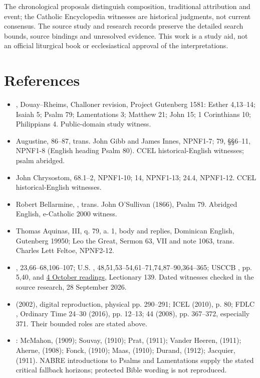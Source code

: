 The chronological proposals distinguish composition, traditional attribution and event; the Catholic Encyclopedia witnesses are historical judgments, not current consensus. The source study and research records preserve the detailed search bounds, source bindings and unresolved evidence. This work is a study aid, not an official liturgical book or ecclesiastical approval of the interpretations.

\section{References}
\begin{itemize}
\item {}, Douay--Rheims, Challoner revision, Project Gutenberg 1581: Esther 4,13--14; Isaiah 5; Psalm 79; Lamentations 3; Matthew 21; John 15; 1 Corinthians 10; Philippians 4. Public-domain study witness.
\item Augustine,  86--87, trans. John Gibb and James Innes, NPNF1-7;  79, §§6--11, NPNF1-8 (English heading Psalm 80). CCEL historical-English witnesses; psalm abridged.
\item John Chrysostom,  68.1--2, NPNF1-10;  14, NPNF1-13;  24.4, NPNF1-12. CCEL historical-English witnesses.
\item Robert Bellarmine, , trans. John O'Sullivan (1866), Psalm 79. Abridged English, e-Catholic 2000 witness.
\item Thomas Aquinas,  III, q. 79, a. 1, body and replies, Dominican English, Gutenberg 19950; Leo the Great, Sermon 63, VII and note 1063, trans. Charles Lett Feltoe, NPNF2-12.
\item {}, 23,66--68,106--107; U.S. , 48,51,53--54,61--71,74,87--90,364--365; USCCB , pp. 5,40, and \href{https://bible.usccb.org/bible/readings/100426.cfm}{4 October readings}, Lectionary 139. Dated witnesses checked in the source research, 28 September 2026.
\item {} (2002), digital reproduction, physical pp. 290--291; ICEL  (2010), p. 80; FDLC , Ordinary Time 24--30 (2016), pp. 12--13;  44 (2008), pp. 367--372, especially 371. Their bounded roles are stated above.
\item {}: McMahon,  (1909); Souvay,  (1910); Prat,  (1911); Vander Heeren,  (1911); Aherne,  (1908); Fonck,  (1910); Maas,  (1910); Durand,  (1912); Jacquier,  (1911). NABRE introductions to Psalms and Lamentations supply the stated critical fallback horizons; protected Bible wording is not reproduced.
\end{itemize}
